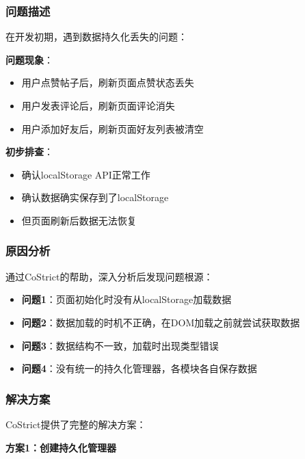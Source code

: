 \documentclass[12pt,a4paper]{article}
\begin{document}
\subsubsection{问题描述}

在开发初期，遇到数据持久化丢失的问题：

\textbf{问题现象}：
\begin{itemize}
    \item 用户点赞帖子后，刷新页面点赞状态丢失
    \item 用户发表评论后，刷新页面评论消失
    \item 用户添加好友后，刷新页面好友列表被清空
\end{itemize}

\textbf{初步排查}：
\begin{itemize}
    \item 确认localStorage API正常工作
    \item 确认数据确实保存到了localStorage
    \item 但页面刷新后数据无法恢复
\end{itemize}

\subsubsection{原因分析}

通过CoStrict的帮助，深入分析后发现问题根源：

\begin{itemize}
    \item \textbf{问题1}：页面初始化时没有从localStorage加载数据
    \item \textbf{问题2}：数据加载的时机不正确，在DOM加载之前就尝试获取数据
    \item \textbf{问题3}：数据结构不一致，加载时出现类型错误
    \item \textbf{问题4}：没有统一的持久化管理器，各模块各自保存数据
\end{itemize}

\subsubsection{解决方案}

CoStrict提供了完整的解决方案：

\textbf{方案1：创建持久化管理器}
\end{document}
